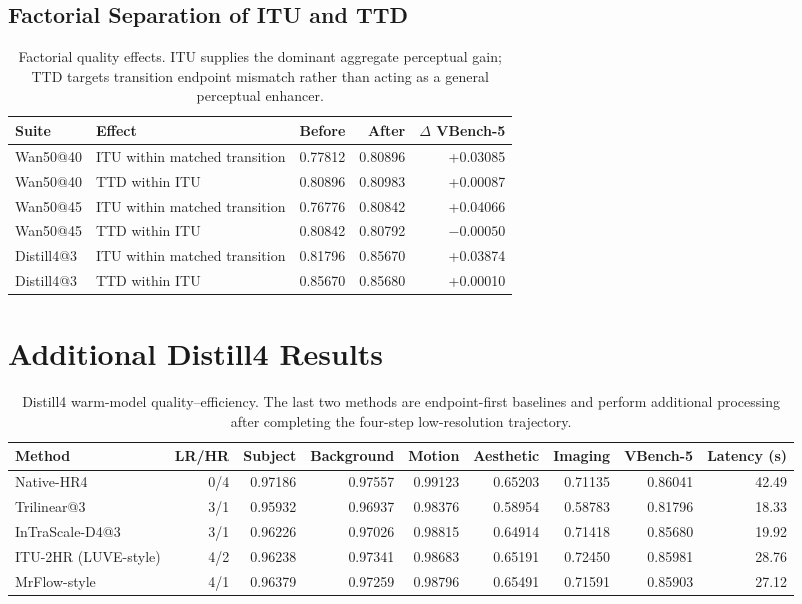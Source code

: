 \documentclass[letterpaper]{article}
\begin{document}
\subsection{Factorial Separation of ITU and TTD}

\begin{table}[H]
  \centering
  \small
  \setlength{\tabcolsep}{4pt}
  \begin{tabular}{llrrr}
    \toprule
    Suite & Effect & Before & After & \(\Delta\) VBench-5 \\
    \midrule
    Wan50@40 & ITU within matched transition & 0.77812 & 0.80896 & +0.03085 \\
    Wan50@40 & TTD within ITU & 0.80896 & 0.80983 & +0.00087 \\
    Wan50@45 & ITU within matched transition & 0.76776 & 0.80842 & +0.04066 \\
    Wan50@45 & TTD within ITU & 0.80842 & 0.80792 & \(-0.00050\) \\
    Distill4@3 & ITU within matched transition & 0.81796 & 0.85670 & +0.03874 \\
    Distill4@3 & TTD within ITU & 0.85670 & 0.85680 & +0.00010 \\
    \bottomrule
  \end{tabular}
  \caption{Factorial quality effects.  ITU supplies the dominant aggregate
  perceptual gain; TTD targets transition endpoint mismatch rather than acting
  as a general perceptual enhancer.}
  \label{tab:factorial}
\end{table}

\section{Additional Distill4 Results}

\begin{table}[H]
  \centering
  \scriptsize
  \setlength{\tabcolsep}{3.2pt}
  \begin{tabular}{lrrrrrrrr}
    \toprule
    Method & LR/HR & Subject & Background & Motion & Aesthetic & Imaging &
    VBench-5 & Latency (s) \\
    \midrule
    Native-HR4 & 0/4 & 0.97186 & 0.97557 & 0.99123 & 0.65203 & 0.71135 &
    0.86041 & 42.49 \\
    Trilinear@3 & 3/1 & 0.95932 & 0.96937 & 0.98376 & 0.58954 & 0.58783 &
    0.81796 & 18.33 \\
    InTraScale-D4@3 & 3/1 & 0.96226 & 0.97026 & 0.98815 & 0.64914 & 0.71418 &
    0.85680 & 19.92 \\
    ITU-2HR (LUVE-style) & 4/2 & 0.96238 & 0.97341 & 0.98683 & 0.65191 &
    0.72450 & 0.85981 & 28.76 \\
    MrFlow-style & 4/1 & 0.96379 & 0.97259 & 0.98796 & 0.65491 & 0.71591 &
    0.85903 & 27.12 \\
    \bottomrule
  \end{tabular}
  \caption{Distill4 warm-model quality--efficiency.  The last two methods are
  endpoint-first baselines and perform additional processing after completing
  the four-step low-resolution trajectory.}
  \label{tab:distill4-full}
\end{table}
\end{document}
